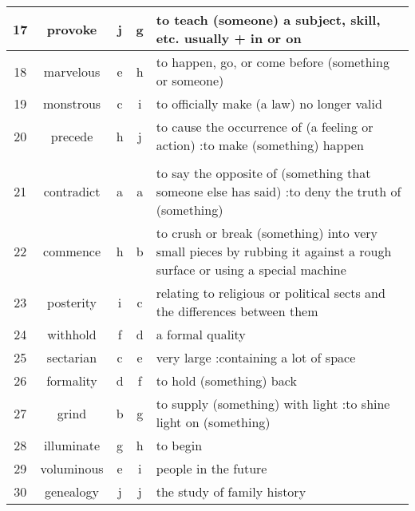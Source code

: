 \documentclass[a4paper]{article}
\begin{document}
\begin{center}
\begin{tabular}{|c|c|c|c|m{}|}
\hline
 17  & provoke & j & g &  to teach (someone) a subject, skill, etc. usually + in or on \\
\hline
 18  & marvelous & e & h &  to happen, go, or come before (something or someone) \\
\hline
 19  & monstrous & c & i &  to officially make (a law) no longer valid \\
\hline
 20  & precede & h & j &  to cause the occurrence of (a feeling or action) :to make (something) happen \\
\hline
 & & & & \\
\hline
 21  & contradict & a & a &  to say the opposite of (something that someone else has said) :to deny the truth of (something) \\
\hline
 22  & commence & h & b &  to crush or break (something) into very small pieces by rubbing it against a rough surface or using a special machine \\
\hline
 23  & posterity & i & c &  relating to religious or political sects and the differences between them \\
\hline
 24  & withhold & f & d &  a formal quality \\
\hline
 25  & sectarian & c & e &  very large :containing a lot of space \\
\hline
 26  & formality & d & f &  to hold (something) back \\
\hline
 27  & grind & b & g &  to supply (something) with light :to shine light on (something) \\
\hline
 28  & illuminate & g & h &  to begin \\
\hline
 29  & voluminous & e & i &  people in the future \\
\hline
 30  & genealogy & j & j &  the study of family history \\
\hline
\end{tabular}
\end{center}
\end{document}
